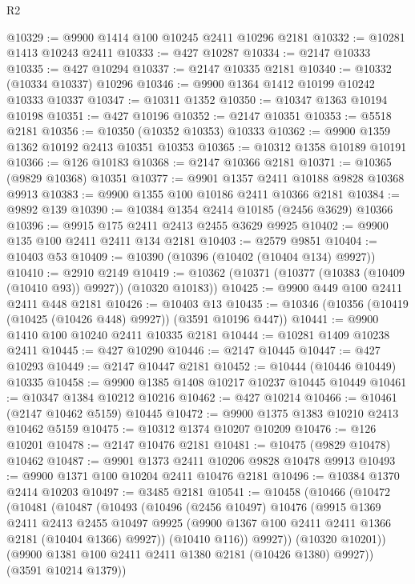 \begin{lexlean}{R2}
\begin{coremodule}
@10329 := @9900 @1414 @100 @10245 @2411 @10296 @2181
@10332 := @10281 @1413 @10243 @2411
@10333 := @427 @10287
@10334 := @2147 @10333
@10335 := @427 @10294
@10337 := @2147 @10335 @2181
@10340 := @10332 (@10334 @10337) @10296
@10346 := @9900 @1364 @1412 @10199 @10242 @10333 @10337
@10347 := @10311 @1352
@10350 := @10347 @1363 @10194 @10198
@10351 := @427 @10196
@10352 := @2147 @10351
@10353 := @5518 @2181
@10356 := @10350 (@10352 @10353) @10333
@10362 := @9900 @1359 @1362 @10192 @2413 @10351 @10353
@10365 := @10312 @1358 @10189 @10191
@10366 := @126 @10183
@10368 := @2147 @10366 @2181
@10371 := @10365 (@9829 @10368) @10351
@10377 := @9901 @1357 @2411 @10188 @9828 @10368 @9913
@10383 := @9900 @1355 @100 @10186 @2411 @10366 @2181
@10384 := @9892 @139
@10390 := @10384 @1354 @2414 @10185 (@2456 @3629) @10366
@10396 := @9915 @175 @2411 @2413 @2455 @3629 @9925
@10402 := @9900 @135 @100 @2411 @2411 @134 @2181
@10403 := @2579 @9851
@10404 := @10403 @53
@10409 := @10390 (@10396 (@10402 (@10404 @134) @9927))
@10410 := @2910 @2149
@10419 := @10362 (@10371 (@10377 (@10383 (@10409 (@10410 @93)) @9927)) (@10320 @10183))
@10425 := @9900 @449 @100 @2411 @2411 @448 @2181
@10426 := @10403 @13
@10435 := @10346 (@10356 (@10419 (@10425 (@10426 @448) @9927)) (@3591 @10196 @447))
@10441 := @9900 @1410 @100 @10240 @2411 @10335 @2181
@10444 := @10281 @1409 @10238 @2411
@10445 := @427 @10290
@10446 := @2147 @10445
@10447 := @427 @10293
@10449 := @2147 @10447 @2181
@10452 := @10444 (@10446 @10449) @10335
@10458 := @9900 @1385 @1408 @10217 @10237 @10445 @10449
@10461 := @10347 @1384 @10212 @10216
@10462 := @427 @10214
@10466 := @10461 (@2147 @10462 @5159) @10445
@10472 := @9900 @1375 @1383 @10210 @2413 @10462 @5159
@10475 := @10312 @1374 @10207 @10209
@10476 := @126 @10201
@10478 := @2147 @10476 @2181
@10481 := @10475 (@9829 @10478) @10462
@10487 := @9901 @1373 @2411 @10206 @9828 @10478 @9913
@10493 := @9900 @1371 @100 @10204 @2411 @10476 @2181
@10496 := @10384 @1370 @2414 @10203
@10497 := @3485 @2181
@10541 := @10458
    (@10466
      (@10472
        (@10481
          (@10487
            (@10493
              (@10496
                (@2456 @10497)
                @10476
                (@9915
                  @1369
                  @2411
                  @2413
                  @2455
                  @10497
                  @9925
                  (@9900 @1367 @100 @2411 @2411 @1366 @2181 (@10404 @1366) @9927))
                (@10410 @116))
              @9927))
          (@10320 @10201))
        (@9900 @1381 @100 @2411 @2411 @1380 @2181 (@10426 @1380) @9927))
      (@3591 @10214 @1379))

\end{coremodule}
\end{lexlean}
